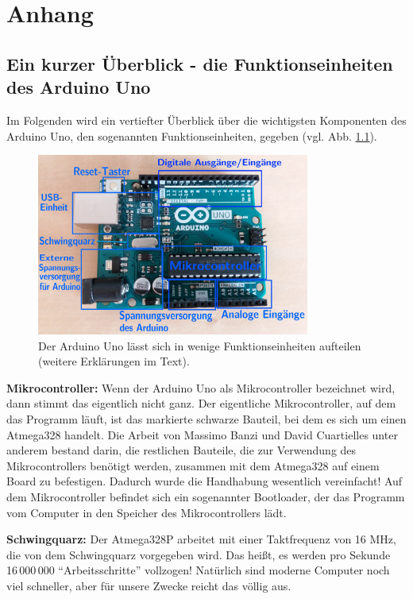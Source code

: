 \chapter{Anhang}

\section{Ein kurzer Überblick - die Funktionseinheiten des Arduino Uno}
\label{sec:ueberblick}
Im Folgenden wird ein vertiefter Überblick über die wichtigsten Komponenten des Arduino Uno, den sogenannten Funktionseinheiten, gegeben (vgl. Abb. \ref{abb:uno_r3}).

\begin{figure}[h]
	\centering
	\includegraphics[width=0.8\textwidth]{pics/arduino-beschriftet.jpeg}
	\caption{Der Arduino Uno lässt sich in wenige Funktionseinheiten aufteilen (weitere Erklärungen im Text).}
	\label{abb:uno_r3}
\end{figure}

\textbf{Mikrocontroller:} Wenn der Arduino Uno als Mikrocontroller bezeichnet wird, dann stimmt das eigentlich nicht ganz. Der eigentliche Mikrocontroller, auf dem das Programm läuft, ist das markierte schwarze Bauteil, bei dem es sich um einen Atmega328 handelt. Die Arbeit von Massimo Banzi und David Cuartielles unter anderem bestand darin, die restlichen Bauteile, die zur Verwendung des Mikrocontrollers benötigt werden, zusammen mit dem Atmega328 auf einem Board zu befestigen. Dadurch wurde die Handhabung wesentlich vereinfacht! Auf dem Mikrocontroller befindet sich ein sogenannter Bootloader, der das Programm vom Computer in den Speicher des Mikrocontrollers lädt.

\textbf{Schwingquarz:} Der Atmega328P arbeitet mit einer Taktfrequenz von 16 MHz, die von dem Schwingquarz vorgegeben wird. Das heißt, es werden pro Sekunde 16\,000\,000 \enquote{Arbeitsschritte} vollzogen! Natürlich sind moderne Computer noch viel schneller, aber für unsere Zwecke reicht das völlig aus.

